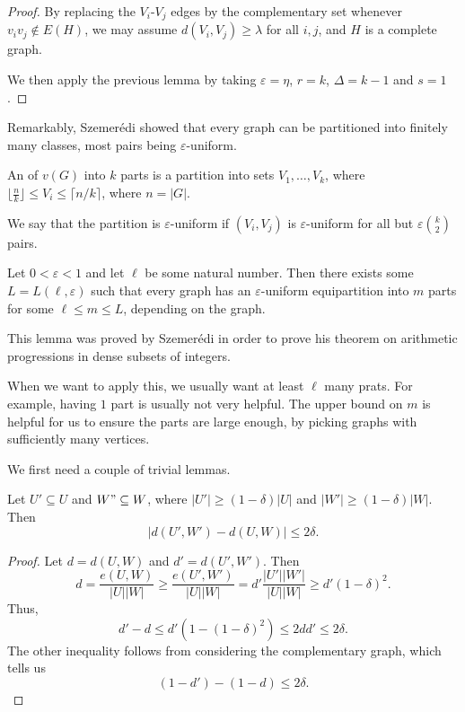 \documentclass[a4paper]{article}
\begin{document}
\begin{proof}
  By replacing the $V_i$-$V_j$ edges by the complementary set whenever $v_i v_j \not \in E(H)$, we may assume $d(V_i, V_j) \geq \lambda$ for all $i, j$, and $H$ is a complete graph.

  We then apply the previous lemma by taking $\varepsilon = \eta$, $r = k$, $\Delta = k- 1$ and $s = 1$.
\end{proof}

Remarkably, Szemer\'edi showed that every graph can be partitioned into finitely many classes, most pairs being $\varepsilon$-uniform.

An  of $v(G)$ into $k$ parts is a partition into sets $V_1, \ldots, V_k$, where $\lfloor \frac{n}{k} \rfloor \leq V_i \leq \lceil n/k\rceil$, where $n = |G|$.

We say that the partition is $\varepsilon$-uniform if $(V_i, V_j)$ is $\varepsilon$-uniform for all but $\varepsilon \binom{k}{2}$ pairs.

\begin{thm}
  Let $0 < \varepsilon < 1$ and let $\ell$ be some natural number. Then there exists some $L = L(\ell, \varepsilon)$ such that every graph has an $\varepsilon$-uniform equipartition into $m$ parts for some $\ell \leq m \leq L$, depending on the graph.
\end{thm}
This lemma was proved by Szemer\'edi in order to prove his theorem on arithmetic progressions in dense subsets of integers.

When we want to apply this, we usually want at least $\ell$ many prats. For example, having $1$ part is usually not very helpful. The upper bound on $m$ is helpful for us to ensure the parts are large enough, by picking graphs with sufficiently many vertices.

We first need a couple of trivial lemmas.
\begin{lemma}
  Let $U' \subseteq U$ and $W" \subseteq W$, where $|U'| \geq (1 - \delta)|U|$ and $|W'| \geq (1 - \delta) |W|$. Then
  \[
    |d(U', W') - d(U, W)| \leq 2\delta.
  \]
\end{lemma}

\begin{proof}
  Let $d = d(U, W)$ and $d' = d(U', W')$. Then
  \[
    d = \frac{e(U, W)}{|U||W|} \geq \frac{e(U', W')}{|U||W|} = d' \frac{|U'||W'|}{|U||W|} \geq d' (1 - \delta)^2.
  \]
  Thus,
  \[
    d' - d \leq d'(1 - (1 - \delta)^2) \leq 2d d' \leq 2 \delta.
  \]
  The other inequality follows from considering the complementary graph, which tells us
  \[
    (1 - d') - (1 - d) \leq 2\delta.
  \]
\end{proof}
\end{document}
